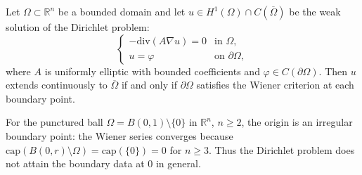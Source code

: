 \begin{theorem}
Let $\Omega \subset \mathbb{R}^n$ be a bounded domain and let $u \in H^1(\Omega) \cap C(\overline{\Omega})$ be the weak solution of the Dirichlet problem:
\[
\begin{cases}
-\mathrm{div}(A\nabla u) = 0 & \text{in } \Omega, \\
u = \varphi & \text{on } \partial\Omega,
\end{cases}
\]
where $A$ is uniformly elliptic with bounded coefficients and $\varphi \in C(\partial\Omega)$.
Then $u$ extends continuously to $\overline{\Omega}$ if and only if $\partial\Omega$ satisfies the Wiener criterion at each boundary point.
\end{theorem}

\begin{example}
For the punctured ball $\Omega = B(0,1) \setminus \{0\}$ in $\mathbb{R}^n$, $n \geq 2$, the origin is an irregular boundary point: the Wiener series converges because $\mathrm{cap}(B(0,r) \setminus \Omega) = \mathrm{cap}(\{0\}) = 0$ for $n \geq 3$. Thus the Dirichlet problem does not attain the boundary data at $0$ in general.
\end{example}
